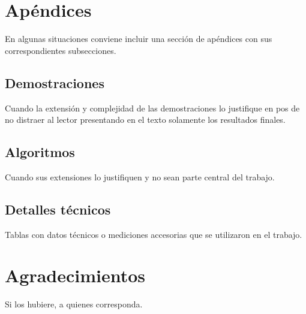 \documentclass[conference,a4paper,10pt,oneside,final]{tfmpd}
\begin{document}
\section{Apéndices}

En algunas situaciones conviene incluir una sección de apéndices con sus correspondientes subsecciones.

\subsection{Demostraciones}

Cuando la extensión y complejidad de las demostraciones lo justifique en pos de no distraer al lector presentando en el texto solamente los resultados finales.

\subsection{Algoritmos}

Cuando sus extensiones lo justifiquen y no sean parte central del trabajo.

\subsection{Detalles técnicos}

Tablas con datos técnicos o mediciones accesorias que se utilizaron en el trabajo.

\section*{Agradecimientos}

Si los hubiere, a quienes corresponda.

\nocite{*}


\end{document}
